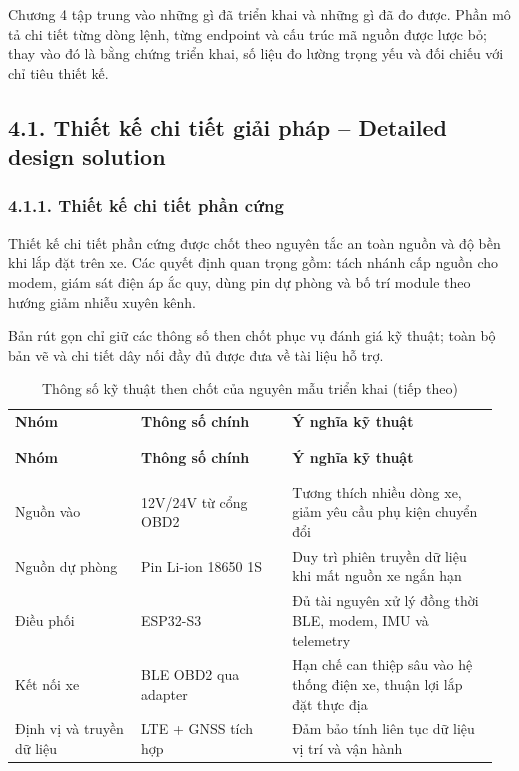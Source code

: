 \documentclass[a4paper]{extarticle}
\newcommand{\thesissettableid}[2]{%
  \renewcommand{\thetable}{#1}%
  \renewcommand{\theHtable}{#2}%
}
\begin{document}
Chương 4 tập trung vào những gì đã triển khai và những gì đã đo được. Phần mô tả chi tiết từng dòng lệnh, từng endpoint và cấu trúc mã nguồn được lược bỏ; thay vào đó là bằng chứng triển khai, số liệu đo lường trọng yếu và đối chiếu với chỉ tiêu thiết kế.

\subsection{4.1. Thiết kế chi tiết giải pháp -- Detailed design solution}

\subsubsection{4.1.1. Thiết kế chi tiết phần cứng}

Thiết kế chi tiết phần cứng được chốt theo nguyên tắc an toàn nguồn và độ bền khi lắp đặt trên xe. Các quyết định quan trọng gồm: tách nhánh cấp nguồn cho modem, giám sát điện áp ắc quy, dùng pin dự phòng và bố trí module theo hướng giảm nhiễu xuyên kênh.

Bản rút gọn chỉ giữ các thông số then chốt phục vụ đánh giá kỹ thuật; toàn bộ bản vẽ và chi tiết dây nối đầy đủ được đưa về tài liệu hỗ trợ.

{\thesissettableid{4.1}{tab-condensed-ch4-hardware-key-specs}
\def\LTcaptype{table}
\begin{longtable}{|L{0.250\linewidth}|L{0.300\linewidth}|L{0.410\linewidth}|}
\caption{Thông số kỹ thuật then chốt của nguyên mẫu triển khai}\label{tab:condensed-ch4-hardware-key-specs}\\
\hline \textbf{Nhóm} & \textbf{Thông số chính} & \textbf{Ý nghĩa kỹ thuật} \\
\\\hline
\endfirsthead
\caption[]{Thông số kỹ thuật then chốt của nguyên mẫu triển khai (tiếp theo)}\\
\hline \textbf{Nhóm} & \textbf{Thông số chính} & \textbf{Ý nghĩa kỹ thuật} \\
\\\hline
\endhead
\\\hline
\endfoot
\endlastfoot
Nguồn vào & 12V/24V từ cổng OBD2 & Tương thích nhiều dòng xe, giảm yêu cầu phụ kiện chuyển đổi \\\hline
Nguồn dự phòng & Pin Li-ion 18650 1S & Duy trì phiên truyền dữ liệu khi mất nguồn xe ngắn hạn \\\hline
Điều phối & ESP32-S3 & Đủ tài nguyên xử lý đồng thời BLE, modem, IMU và telemetry \\\hline
Kết nối xe & BLE OBD2 qua adapter & Hạn chế can thiệp sâu vào hệ thống điện xe, thuận lợi lắp đặt thực địa \\\hline
Định vị và truyền dữ liệu & LTE + GNSS tích hợp & Đảm bảo tính liên tục dữ liệu vị trí và vận hành \\\hline
\end{longtable}
}
\end{document}
